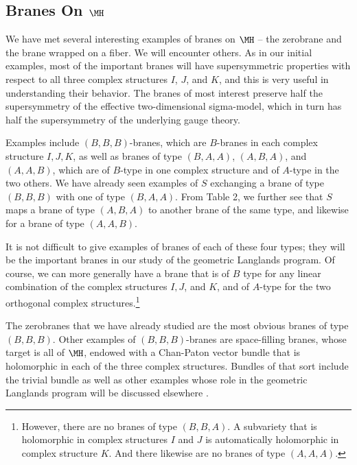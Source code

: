 \subsection{Branes On $\MH$}

\label{sec:mhbranes}

We have  met several interesting examples of branes on $\MH$ --
the zerobrane and the brane wrapped on a fiber.  We will encounter
others.  As in our initial examples, most of the important branes
will  have supersymmetric properties with respect to all three
complex structures $I$, $J$, and $K$, and this is very useful in
understanding their behavior.  The branes of most interest
preserve half the supersymmetry of the effective two-dimensional
sigma-model, which in turn has half the supersymmetry of the
underlying gauge theory.

Examples include $(B,B,B)$-branes, which are $B$-branes in each
complex structure $I,J,K$, as well as branes of type $(B,A,A)$,
$(A,B,A)$, and $(A,A,B)$, which are of $ B$-type in one complex
structure and of $ A$-type in the two others. We have already seen
examples of $S$ exchanging a brane of type $(B,B,B)$ with one of
type $(B,A,A)$. {}From Table 2, we further see that $S$ maps a
brane of type $(A,B,A)$ to another brane of the same type, and
likewise for a brane of type $(A,A,B)$.

It is not difficult to give  examples of branes of each of these
four types; they will be the important branes in our study of the
geometric Langlands program.   Of course, we can more generally
have a brane that is of $B$ type for any linear combination of the
complex structures $I,J$, and $K$, and of $A$-type for the two
orthogonal complex structures.\footnote{However, there are no branes
of type $(B,B,A)$.  A subvariety that is holomorphic in complex
structures $I$ and $J$ is automatically holomorphic in complex
structure $K$.  And there likewise are no branes of type
$(A,A,A)$.}

The zerobranes that we have already studied are the most obvious
branes of type $(B,B,B)$.   Other examples of $(B,B,B)$-branes are
space-filling branes, whose target is all of $\MH$, endowed with a
Chan-Paton vector bundle that is holomorphic in each of the three
complex structures. Bundles of that sort include the trivial
bundle as well as other examples whose role in the geometric
Langlands program will be discussed elsewhere \cite{ref26}.

